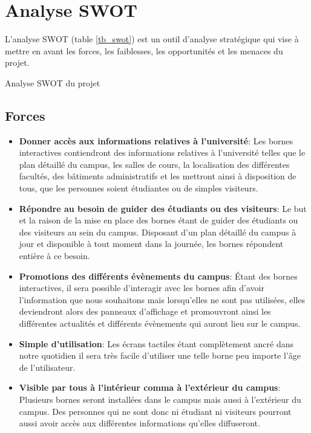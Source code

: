 \chapter{Analyse SWOT}
L’analyse SWOT (table \ref{tb_swot}) est un outil d’analyse stratégique qui vise à mettre en avant les forces, les faiblesses, les opportunités et les menaces du projet.  

\begin{table}[H]
\caption{Analyse SWOT du projet}
\label{tb_swot}

\end{table}


\section{Forces}
\begin{itemize}

\item\textbf{Donner accès aux informations relatives à l’université}: Les bornes interactives contiendront des informations relatives à l’université telles que le plan détaillé du campus, les salles de cours, la localisation des différentes facultés, des bâtiments administratifs et les mettront ainsi à disposition de tous, que les personnes soient étudiantes ou de simples visiteurs. 

\item\textbf{Répondre au besoin de guider des étudiants ou des visiteurs}: Le but et la raison de la mise en place des bornes étant de guider des étudiants ou des visiteurs au sein du campus. Disposant d’un plan détaillé du campus à jour et disponible à tout moment dans la journée, les bornes répondent entière à ce besoin. 
\item\textbf{Promotions des différents évènements du campus}: Étant des bornes interactives, il sera possible d’interagir avec les bornes afin d’avoir l’information que nous souhaitons mais lorsqu’elles ne sont pas utilisées, elles deviendront alors des panneaux d’affichage et promouvront ainsi les différentes actualités et différents évènements qui auront lieu sur le campus. 
\item\textbf{Simple d'utilisation}: Les écrans tactiles étant complètement ancré dans notre quotidien il sera très facile d’utiliser une telle borne peu importe l’âge de l’utilisateur. 

\item\textbf{Visible par tous à l’intérieur comma à l’extérieur du campus}: Plusieurs bornes seront installées dans le campus mais aussi à l’extérieur du campus. Des personnes qui ne sont donc ni étudiant ni visiteurs pourront aussi avoir accès aux différentes informations qu’elles diffuseront. 

\end{itemize}

